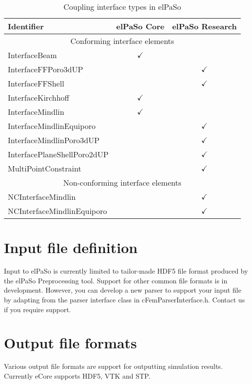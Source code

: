 \begin{table}[H]
    \centering
    \caption{Coupling interface types in elPaSo}
    \begin{tabular}{lcc}
        \hline
    Identifier                  & \multicolumn{1}{c}{elPaSo Core} & \multicolumn{1}{c}{elPaSo Research} \\ \hline
    \multicolumn{3}{c}{Conforming interface elements}                                                   \\ \hline
    InterfaceBeam               & $\checkmark$                    &                                     \\
    InterfaceFFPoro3dUP         &                                 & $\checkmark$                        \\
    InterfaceFFShell            &                                 & $\checkmark$                        \\
    InterfaceKirchhoff          & $\checkmark$                    &                                     \\
    InterfaceMindlin            & $\checkmark$                    &                                     \\
    InterfaceMindlinEquiporo    &                                 & $\checkmark$                        \\
    InterfaceMindlinPoro3dUP    &                                 & $\checkmark$                        \\
    InterfacePlaneShellPoro2dUP &                                 & $\checkmark$                        \\
    MultiPointConstraint        &                                 & $\checkmark$                        \\ \hline
    \multicolumn{3}{c}{Non-conforming interface elements}                                               \\ \hline
    NCInterfaceMindlin          &                                 & $\checkmark$                        \\
    NCInterfaceMindlinEquiporo  &                                 & $\checkmark$                        \\ \hline
    \end{tabular}
    \end{table}

\section{Input file definition}
Input to elPaSo is currently limited to tailor-made HDF5 file format produced by the elPaSo Preprocessing tool. Support for other common file formats is in development. However, you can develop a new parser to support your input file by adapting from the parser interface class in cFemParserInterface.h. Contact us if you require support.

\section{Output file formats}
Various output file formats are support for outputting simulation results. Currently eCore supports HDF5, VTK and STP.